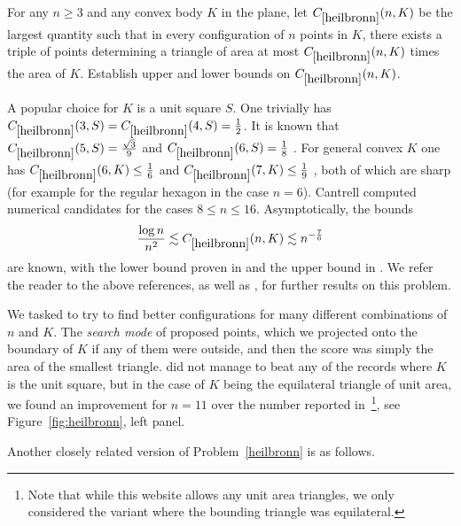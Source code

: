 \renewcommand{\problemURL}{https://google-deepmind.github.io/alphaevolve_repository_of_problems/problems/48.html}

\begin{problem}\label{heilbronn}  For any $n \geq 3$ and any convex body $K$ in the plane, let $C_{\ref{heilbronn}}(n,K)$ be the largest quantity such that in every configuration of $n$ points in $K$, there exists a triple of points determining a triangle of area at most $C_{\ref{heilbronn}}(n,K)$ times the area of $K$.  Establish upper and lower bounds on $C_{\ref{heilbronn}}(n,K)$.
\end{problem}

A popular choice for $K$ is a unit square $S$.  One trivially has $C_{\ref{heilbronn}}(3,S) = C_{\ref{heilbronn}}(4,S) = \frac{1}{2}$.  It is known that $C_{\ref{heilbronn}}(5,S) = \frac{\sqrt{3}}{9}$ and $C_{\ref{heilbronn}}(6,S) = \frac{1}{8}$ \cite{yangzhangzeng}.  For general convex $K$ one has $C_{\ref{heilbronn}}(6,K) \leq \frac{1}{6}$ \cite{dress_yang_zeng_1995} and $C_{\ref{heilbronn}}(7,K) \leq \frac{1}{9}$ \cite{yang_zeng_1995}, both of which are sharp (for example for the regular hexagon in the case $n=6$). Cantrell \cite{cantrell_2007_heilbronn_convex} computed numerical candidates for the cases $8 \leq n \leq 16$.  Asymptotically, the bounds
$$ \frac{\log n}{n^2} \lesssim C_{\ref{heilbronn}}(n,K) \lesssim n^{-\frac{7}{6}}$$
are known, with the lower bound proven in \cite{komlos} and the upper bound in \cite{cohen}. We refer the reader to the above references, as well as \cite[Problem 507]{erdosproblems}, for further results on this problem.

We tasked \AlphaEvolve to try to find better configurations for many different combinations of $n$ and $K$. The \emph{search mode} of \AlphaEvolve proposed points, which we projected onto the boundary of $K$ if any of them were outside, and then the score was simply the area of the smallest triangle. \AlphaEvolve did not manage to beat any of the records where $K$ is the unit square, but in the case of $K$ being the equilateral triangle of unit area, we found an improvement for $n=11$ over the number reported in~\cite{friedman_heilbronn_triangle}\footnote{Note that while this website allows any unit area triangles, we only considered the variant where the bounding triangle was equilateral.}, see Figure~\ref{fig:heilbronn}, left panel. 

Another closely related version of Problem~\ref{heilbronn} is as follows.

